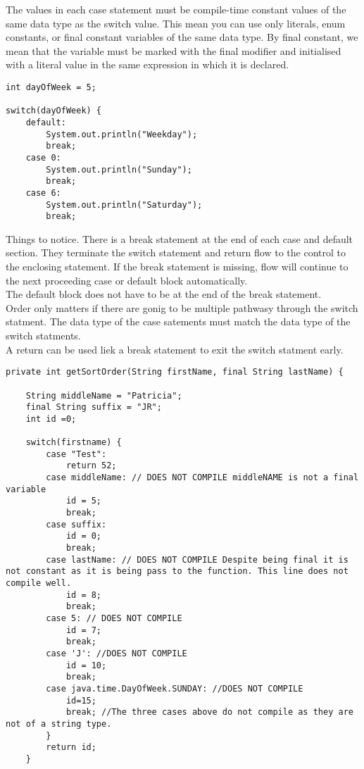 \documentclass[a4paper]{report}   %
\begin{document}
The values in each case statement must be compile-time constant values of the same data type as the switch value. This mean you can use only literals, enum constants, or final constant variables of the same data type. By final constant, we mean that the variable must be marked with the final modifier and initialised with a literal value in the same expression in which it is declared.

\begin{lstlisting}
int dayOfWeek = 5;

switch(dayOfWeek) {
	default:
		System.out.println("Weekday");
		break;
	case 0:
		System.out.println("Sunday");
		break;
	case 6:
		System.out.println("Saturday");
		break;
\end{lstlisting}

Things to notice. There is a break statement at the end of each case and default section. They terminate the switch statement and return flow to the control to the enclosing statement. If the break statement is missing, flow will continue to the next proceeding case or default block automatically.\\
The default block does not have to be at the end of the break statement. \\ Order only matters if there are gonig to be multiple pathwasy through the switch statment. The data type of the case satements must match the data type of the switch statments.\\ A return can be used liek a break statement to exit the switch statment early. 

\begin{lstlisting}
private int getSortOrder(String firstName, final String lastName) {
	
	String middleName = "Patricia";
	final String suffix = "JR";
	int id =0;
	
	switch(firstname) {
		case "Test":
			return 52;
		case middleName: // DOES NOT COMPILE middleNAME is not a final variable
			id = 5;
			break;
		case suffix:
			id = 0;
			break;
		case lastName: // DOES NOT COMPILE Despite being final it is not constant as it is being pass to the function. This line does not compile well. 
			id = 8;
			break;
		case 5: // DOES NOT COMPILE
			id = 7;
			break;
		case 'J': //DOES NOT COMPILE
			id = 10;
			break;
		case java.time.DayOfWeek.SUNDAY: //DOES NOT COMPILE
			id=15;
			break; //The three cases above do not compile as they are not of a string type.
		}
		return id;
	}
	
	
\end{lstlisting}
\end{document}
